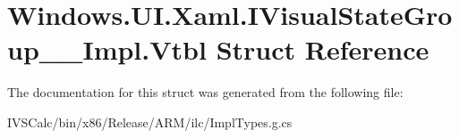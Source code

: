 \hypertarget{struct_windows_1_1_u_i_1_1_xaml_1_1_i_visual_state_group_____impl_1_1_vtbl}{}\section{Windows.\+U\+I.\+Xaml.\+I\+Visual\+State\+Group\+\_\+\+\_\+\+Impl.\+Vtbl Struct Reference}
\label{struct_windows_1_1_u_i_1_1_xaml_1_1_i_visual_state_group_____impl_1_1_vtbl}


The documentation for this struct was generated from the following file\+:\begin{DoxyCompactItemize}
\item 
I\+V\+S\+Calc/bin/x86/\+Release/\+A\+R\+M/ilc/Impl\+Types.\+g.\+cs\end{DoxyCompactItemize}
